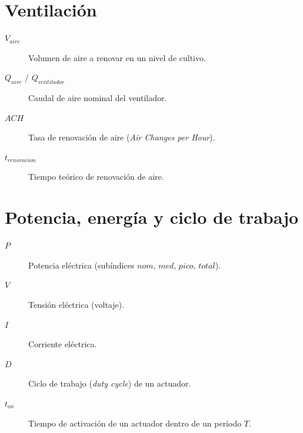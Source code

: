 \section*{Ventilación}
\begin{description}
    \item[$V_{aire}$] Volumen de aire a renovar en un nivel de cultivo.
    \item[$Q_{aire}$ / $Q_{ventilador}$] Caudal de aire nominal del ventilador.
    \item[$ACH$] Tasa de renovación de aire (\textit{Air Changes per Hour}).
    \item[$t_{renovacion}$] Tiempo teórico de renovación de aire.
\end{description}

\section*{Potencia, energía y ciclo de trabajo}
\begin{description}
    \item[$P$] Potencia eléctrica (subíndices $nom$, $med$, $pico$, $total$).
    \item[$V$] Tensión eléctrica (voltaje).
    \item[$I$] Corriente eléctrica.
    \item[$D$] Ciclo de trabajo (\textit{duty cycle}) de un actuador.
    \item[$t_{on}$] Tiempo de activación de un actuador dentro de un período $T$.
\end{description}

